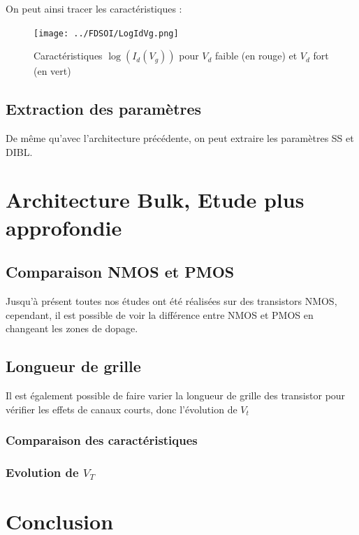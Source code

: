 \documentclass[a4paper,11pt]{report}
\begin{document}
On peut ainsi tracer les caractéristiques :
\begin{figure}[H]
    \centering
    \texttt{[image: ../FDSOI/LogIdVg.png]}
    \caption{Caractéristiques $\log(I_d(V_g))$ pour $V_d$ faible (en rouge) et $V_d$ fort (en vert)}    
\end{figure}


\section{Extraction des paramètres}

De même qu'avec l'architecture précédente, on peut extraire les paramètres SS et DIBL.


\chapter{Architecture Bulk, Etude plus approfondie}

\section{Comparaison NMOS et PMOS}

Jusqu'à présent toutes nos études ont été réalisées sur des transistors NMOS, cependant, il est possible de voir la différence entre NMOS et PMOS en changeant les zones de dopage. 

\section{Longueur de grille}
Il est également possible de faire varier la longueur de grille des transistor pour vérifier les effets de canaux courts, donc l'évolution de $V_t$

\subsection{Comparaison des caractéristiques}

\subsection{Evolution de $V_T$}

\subsection{}

\chapter*{Conclusion}
\end{document}
